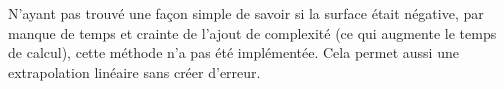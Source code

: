 N'ayant pas trouvé une façon simple de savoir si la surface était négative, par manque de temps et crainte de l'ajout de complexité (ce qui augmente le temps de calcul), cette méthode n'a pas été implémentée.
Cela permet aussi une extrapolation linéaire sans créer d'erreur.

